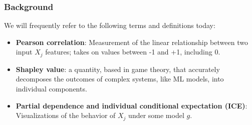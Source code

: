 \documentclass[11pt,aspectratio=169,hyperref={colorlinks}]{beamer}
\begin{document}
		\begin{frame}
		
			\frametitle{Background}		
			
			We will frequently refer to the following terms and definitions today: \\			
			
			\begin{itemize}
				\item{\textbf{Pearson correlation}: Measurement of the linear relationship between two input $X_j$ features; takes on values between -1 and +1, including 0.}
				\item{\textbf{Shapley value}: a quantity, based in game theory, that accurately decomposes the outcomes of complex systems, like ML models, into individual components.}
				\item{\textbf{Partial dependence and individual conditional expectation (ICE)}: Visualizations of the behavior of $X_j$ under some model $g$.}
			\end{itemize}			
		
		\end{frame}
\end{document}
